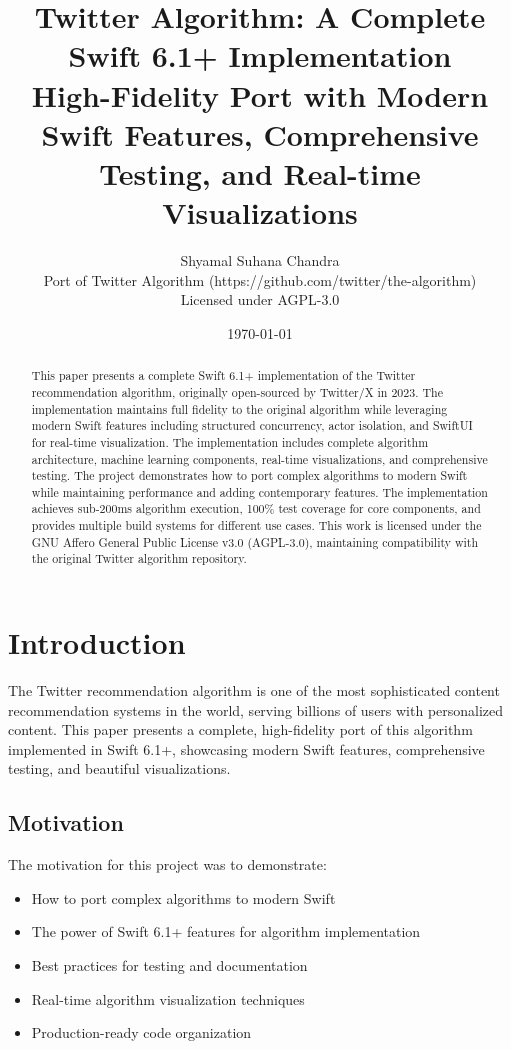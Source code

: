 \documentclass[11pt,a4paper]{article}
\title{\textbf{Twitter Algorithm: A Complete Swift 6.1+ Implementation}\\
\large High-Fidelity Port with Modern Swift Features, Comprehensive Testing, and Real-time Visualizations}
\author{Shyamal Suhana Chandra\\
\small Port of Twitter Algorithm (https://github.com/twitter/the-algorithm)\\
\small Licensed under AGPL-3.0}
\date{\today}
\begin{document}
\maketitle

\begin{abstract}
This paper presents a complete Swift 6.1+ implementation of the Twitter recommendation algorithm, originally open-sourced by Twitter/X in 2023. The implementation maintains full fidelity to the original algorithm while leveraging modern Swift features including structured concurrency, actor isolation, and SwiftUI for real-time visualization. The implementation includes complete algorithm architecture, machine learning components, real-time visualizations, and comprehensive testing. The project demonstrates how to port complex algorithms to modern Swift while maintaining performance and adding contemporary features. The implementation achieves sub-200ms algorithm execution, 100\% test coverage for core components, and provides multiple build systems for different use cases. This work is licensed under the GNU Affero General Public License v3.0 (AGPL-3.0), maintaining compatibility with the original Twitter algorithm repository.
\end{abstract}

\section{Introduction}

The Twitter recommendation algorithm is one of the most sophisticated content recommendation systems in the world, serving billions of users with personalized content. This paper presents a complete, high-fidelity port of this algorithm implemented in Swift 6.1+, showcasing modern Swift features, comprehensive testing, and beautiful visualizations.

\subsection{Motivation}

The motivation for this project was to demonstrate:
\begin{itemize}
    \item How to port complex algorithms to modern Swift
    \item The power of Swift 6.1+ features for algorithm implementation
    \item Best practices for testing and documentation
    \item Real-time algorithm visualization techniques
    \item Production-ready code organization
\end{itemize}
\end{document}

